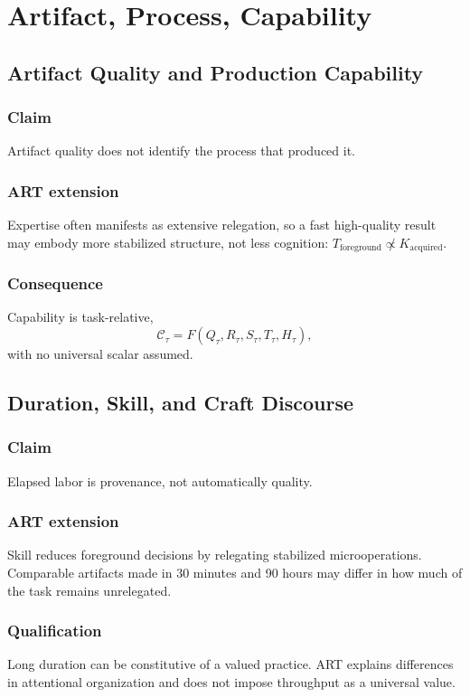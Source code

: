 \documentclass[11pt,openany]{book}
\newcommand{\Capab}{\mathcal{C}}
\begin{document}
\part{Artifact, Process, Capability}

\chapter{Artifact Quality and Production Capability}
\section{Claim}
Artifact quality does not identify the process that produced it.
\section{ART extension}
Expertise often manifests as extensive relegation, so a fast high-quality
result may embody more stabilized structure, not less cognition:
$T_{\text{foreground}}\not\propto K_{\text{acquired}}$.
\section{Consequence}
Capability is task-relative,
\[
  \Capab_\tau=F(Q_\tau,R_\tau,S_\tau,T_\tau,H_\tau),
\]
with no universal scalar assumed.

\chapter{Duration, Skill, and Craft Discourse}
\section{Claim}
Elapsed labor is provenance, not automatically quality.
\section{ART extension}
Skill reduces foreground decisions by relegating stabilized
microoperations. Comparable artifacts made in 30 minutes and 90 hours may
differ in how much of the task remains unrelegated.
\section{Qualification}
Long duration can be constitutive of a valued practice. ART explains
differences in attentional organization and does not impose throughput as
a universal value.
\end{document}
